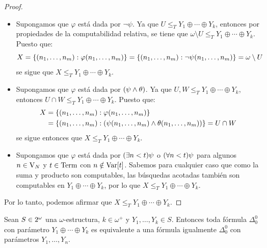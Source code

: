 \begin{proof}
\begin{itemize}
		\begin{itemize}
			\item Supongamos que $\varphi$ está dada por $\neg\psi$. Ya que $U\leq_{T} Y_{1}\oplus\dotsb\oplus Y_{k}$, entonces por propiedades de la computabilidad relativa, se tiene que $\omega\setminus U\leq_{T} Y_{1}\oplus\dotsb\oplus Y_{k}$. Puesto que:
			\[
				X =\set*{\pa*{n_{1},\dotsc, n_{m}}:\varphi\pa*{n_{1},\dotsc, n_{m}}} =\set*{\pa*{n_{1},\dotsc, n_{m}}:\neg\psi\pa*{n_{1},\dotsc, n_{m}}} =\omega\setminus U
			\]
			se sigue que $X\leq_{T} Y_{1}\oplus\dotsb\oplus Y_{k}$.
			\item Supongamos que $\varphi$ está dada por $\pa*{\psi\land\theta}$. Ya que $U, W\leq_{T} Y_{1}\oplus\dotsb\oplus Y_{k}$, entonces $U\cap W\leq_{T} Y_{1}\oplus\dotsb\oplus Y_{k}$. Puesto que:
			\begin{align*}
				X &=\set*{\pa*{n_{1},\dotsc, n_{m}}:\varphi\pa*{n_{1},\dotsc, n_{m}}}\\
				&=\set*{\pa*{n_{1},\dotsc, n_{m}}:\pa*{\psi\pa*{n_{1},\dotsc, n_{m}}\land\theta\pa*{n_{1},\dotsc, n_{m}}}} = U\cap W
			\end{align*}
			se sigue entonces que $X\leq_{T} Y_{1}\oplus\dotsb\oplus Y_{k}$.
			\item Supongamos que $\varphi$ está dada por $\pa*{\exists n < t}\psi$ o $\pa*{\forall n < t}\psi$ para algunos $n\in\VARIABLES[N]$ y $t\in\TERMINOS$ con $n\notin\mathrm{Var}\bra*{t}$. Sabemos para cualquier caso que como la suma y producto son computables, las búsquedas acotadas también son computables en $Y_{1}\oplus\dotsb\oplus Y_{k}$, por lo que $X\leq_{T} Y_{1}\oplus\dotsb\oplus Y_{k}$.
		\end{itemize}
	\end{itemize}

	Por lo tanto, podemos afirmar que $X\leq_{T} Y_{1}\oplus\dotsb\oplus Y_{k}$.
\end{proof}

\begin{theorem}
	\label{theo: yunta_como_parametro}
	Sean $S\in\CPOTENCIA{\omega}$ una $\omega$-estructura, $k\in\omega^{+}$ y $Y_{1},\dotsc, Y_{k}\in S$. Entonces toda fórmula $\Delta_{0}^{0}$ con parámetro $Y_{1}\oplus\dotsb\oplus Y_{k}$ es equivalente a una fórmula igualmente $\Delta_{0}^{0}$ con parámetros $Y_{1},\dotsc, Y_{n}$.
\end{theorem}

